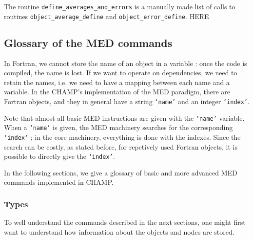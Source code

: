 \documentclass[a4paper,11pt]{article}
\begin{document}
The routine {\tt define_averages_and_errors} is a manually made list of calls to routines {\tt object_average_define} and {\tt object_error_define}.
HERE

\subsection{Glossary of the MED commands}

In Fortran, we cannot store the name of an object in a variable : once the code is compiled, the name is lost.
If we want to operate on dependencies, we need to retain the names, i.e. we need to have a mapping between each name and a variable.
In the CHAMP's implementation of the MED paradigm, there are Fortran objects, and they in general have a string {\tt `name'} and an integer {\tt `index'}.

Note that almost all basic MED instructions are given with the {\tt `name'} variable.
When a {\tt `name'} is given, the MED machinery searches for the corresponding {\tt `index'} ; in the core machinery, everything is done with the indexes.
Since the search can be costly, as stated before, for repetively used Fortran objects, it is possible to directly give the {\tt `index'}.

In the following sections, we give a glossary of basic and more advanced MED commands implemented in CHAMP.

\subsubsection{Types}
\label{subsub:types}

To well understand the commands described in the next sections, one might first want to understand how information about the objects and nodes are stored.
\end{document}
